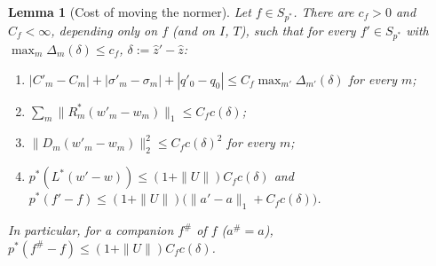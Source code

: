 \documentclass[10pt]{amsart}
\newtheorem{lemma}[theorem]{Lemma}
\theoremstyle{definition}
\theoremstyle{remark}
\newcommand{\zh}{\hat z}
\begin{document}
\begin{lemma}[Cost of moving the normer]\label{lem:II-cost}
Let $f\in S_{p^*}$.  There are $c_f>0$ and $C_f<\infty$, depending only on
$f$ \textup{(}and on $I$, $T$\textup{)}, such that for every $f'\in S_{p^*}$
with $\max_m\Delta_m(\delta)\le c_f$, $\delta:=\zh'-\zh$:
\begin{enumerate}
\item[(i)] $|C'_m-C_m|+|\sigma'_m-\sigma_m|+|q'_0-q_0|\le C_f\max_{m'}
\Delta_{m'}(\delta)$ for every $m$;
\item[(ii)] $\sum_m\|R_m^*(w'_m-w_m)\|_1\le C_fc(\delta)$;
\item[(iii)] $\|D_m(w'_m-w_m)\|_2^2\le C_fc(\delta)^2$ for every $m$;
\item[(iv)] $p^*(L^*(w'-w))\le(1+\|U\|)C_fc(\delta)$ and
$p^*(f'-f)\le(1+\|U\|)\big(\|a'-a\|_1+C_fc(\delta)\big)$.
\end{enumerate}
In particular, for a companion $f^\#$ of $f$ \textup{(}$a^\#=a$\textup{)},
$p^*(f^\#-f)\le(1+\|U\|)C_fc(\delta)$.
\end{lemma}
\end{document}
